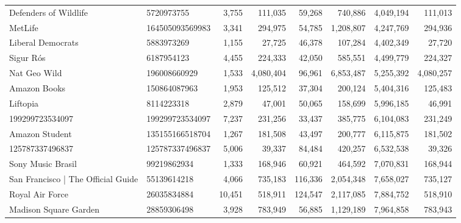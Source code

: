 \begin{longtable}{llrrrrrr}
                             Defenders of Wildlife &       5720973755 &   3,755 &     111,035 &     59,268 &     740,886 &   4,049,194 &   111,013 \\
                                           MetLife &  164505093569983 &   3,341 &     294,975 &     54,785 &   1,208,807 &   4,247,769 &   294,936 \\
                                 Liberal Democrats &       5883973269 &   1,155 &      27,725 &     46,378 &     107,284 &   4,402,349 &    27,720 \\
                                         Sigur Rós &       6187954123 &   4,455 &     224,333 &     42,050 &     585,551 &   4,499,779 &   224,327 \\
                                      Nat Geo Wild &     196008660929 &   1,533 &   4,080,404 &     96,961 &   6,853,487 &   5,255,392 & 4,080,257 \\
                                      Amazon Books &     150864087963 &   1,953 &     125,512 &     37,304 &     200,124 &   5,404,316 &   125,483 \\
                                          Liftopia &       8114223318 &   2,879 &      47,001 &     50,065 &     158,699 &   5,996,185 &    46,991 \\
                                   199299723534097 &  199299723534097 &   7,237 &     231,256 &     33,437 &     385,775 &   6,104,083 &   231,249 \\
                                    Amazon Student &  135155166518704 &   1,267 &     181,508 &     43,497 &     200,777 &   6,115,875 &   181,502 \\
                                   125787337496837 &  125787337496837 &   5,006 &      39,337 &     84,484 &     420,257 &   6,532,538 &    39,326 \\
                                 Sony Music Brasil &      99219862934 &   1,333 &     168,946 &     60,921 &     464,592 &   7,070,831 &   168,944 \\
                San Francisco | The Official Guide &      55139614218 &   4,066 &     735,183 &    116,336 &   2,054,348 &   7,658,027 &   735,127 \\
                                   Royal Air Force &      26035834884 &  10,451 &     518,911 &    124,547 &   2,117,085 &   7,884,752 &   518,910 \\
                             Madison Square Garden &      28859306498 &   3,928 &     783,949 &     56,885 &   1,129,189 &   7,964,858 &   783,943 \\

\end{longtable}
